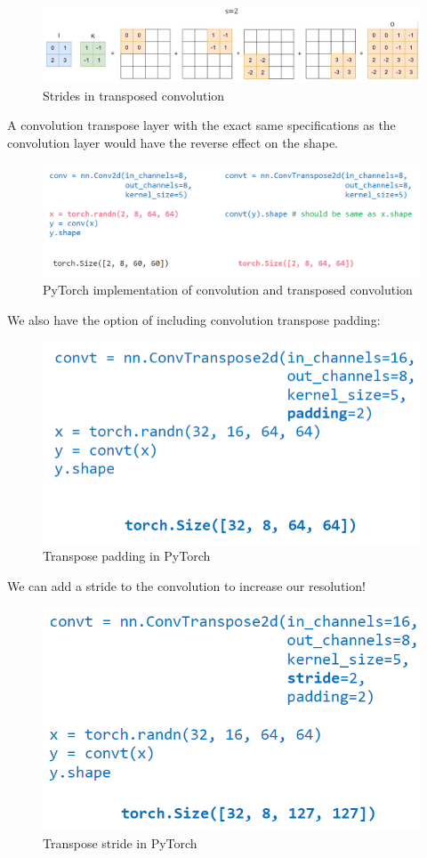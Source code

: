 \begin{figure}[h!t]
    \centering
    \includegraphics[width=0.75\linewidth]{stridesconvae.png}
     \caption{Strides in transposed convolution}
    \label{fig:enter-label}
\end{figure}

A convolution transpose layer with the exact same specifications as the convolution
layer would have the reverse effect on the shape.

\begin{figure}[h!t]
    \centering
    \includegraphics[width=0.5\linewidth]{convandtconv.png}
    \caption{PyTorch implementation of convolution and transposed convolution}
    \label{fig:enter-label}
\end{figure}

\newpage

We also have the option of including convolution transpose padding:

\begin{figure}[h!t]
    \centering
    \includegraphics[width=0.35\linewidth]{tpadding.png}
    \caption{Transpose padding in PyTorch}
    \label{fig:enter-label}
\end{figure}

We can add a stride to the convolution to increase our resolution!

\begin{figure}[h!t]
    \centering
    \includegraphics[width=0.35\linewidth]{stridetconv.png}
    \caption{Transpose stride in PyTorch}
    \label{fig:enter-label}
\end{figure}

